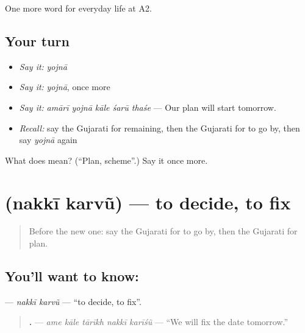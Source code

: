 \begin{grammarlens}[title={What you've built}]
One more word for everyday life at A2.
\end{grammarlens}

\subsection*{Your turn}
\begin{itemize}
\raggedright
  \item \emph{Say it:} \emph{yojnā}
  \item \emph{Say it:} \emph{yojnā}, once more
  \item \emph{Say it:} \emph{amārī yojnā kāle śarū thaśe} — Our plan will start tomorrow.
  \item \emph{Recall:} say the Gujarati for remaining, then the Gujarati for to go by, then say \emph{yojnā} again
\end{itemize}

\begin{tcolorbox}[breakable,colback=teal!4,colframe=teal!35!black,title={Before you move on}]
What does  mean? (\textquotedblleft{}Plan, scheme\textquotedblright{}.) Say it once more.
\end{tcolorbox}
\section[\texorpdfstring{\gu{નક્કી} \gu{કરવું} (nakkī karvũ)}{નક્કી કરવું (nakkī karvũ)}]{  (nakkī karvũ) — to decide, to fix}

\label{lesson:GU-C179-nakki-karvu}



\begin{quote}
Before the new one: say the Gujarati for to go by, then the Gujarati for plan.
\end{quote}

\subsection*{You'll want to know:  }
\textbf{ } — \emph{nakkī karvũ} — \textquotedblleft{}to decide, to fix\textquotedblright{}.

\begin{quote}
\textbf{    .} — \emph{ame kāle tārīkh nakkī karīśũ} — \textquotedblleft{}We will fix the date tomorrow.\textquotedblright{}
\end{quote}

